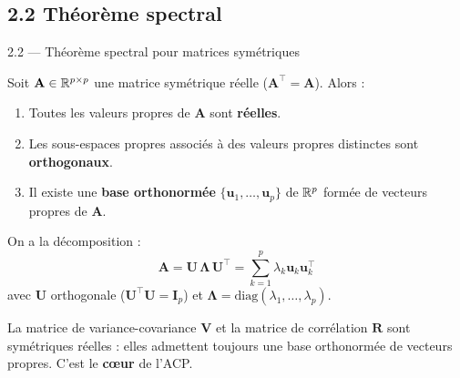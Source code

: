 \subsection{2.2 Théorème spectral}
\begin{frame}{2.2 — Théorème spectral pour matrices symétriques}
\begin{theorem}
Soit $\mathbf{A} \in \mathbb{R}^{p \times p}$ une matrice \alert{symétrique réelle}
($\mathbf{A}^\top = \mathbf{A}$). Alors :
\begin{enumerate}
  \item Toutes les valeurs propres de $\mathbf{A}$ sont \textbf{réelles}.
  \item Les sous-espaces propres associés à des valeurs propres distinctes
        sont \textbf{orthogonaux}.
  \item Il existe une \textbf{base orthonormée} $\{\mathbf{u}_1, \ldots, \mathbf{u}_p\}$
        de $\mathbb{R}^p$ formée de vecteurs propres de $\mathbf{A}$.
\end{enumerate}
On a la décomposition :
\[
\boxed{\;\mathbf{A} = \mathbf{U}\, \mathbf{\Lambda}\, \mathbf{U}^\top
       = \sum_{k=1}^p \lambda_k \mathbf{u}_k \mathbf{u}_k^\top \;}
\]
avec $\mathbf{U}$ orthogonale ($\mathbf{U}^\top \mathbf{U} = \mathbf{I}_p$) et
$\mathbf{\Lambda} = \text{diag}(\lambda_1, \ldots, \lambda_p)$.
\end{theorem}

\begin{rema}
\small La matrice de variance-covariance $\mathbf{V}$ et la matrice de corrélation
$\mathbf{R}$ sont symétriques réelles : elles admettent toujours une base
\alert{orthonormée} de vecteurs propres. C'est le \textbf{cœur} de l'ACP.
\end{rema}
\end{frame}

